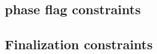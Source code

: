 \subsection{\utils{} phase flag constraints}                                                             \label{rlp auth: generalities: utils phase flag constraints}               
\subsection{Finalization constraints}                                                                    \label{rlp auth: generalities: finalization}                               
